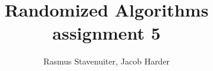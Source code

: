 

\title{Randomized Algorithms assignment 5}
\author{Rasmus Stavenuiter, Jacob Harder}


\maketitle








